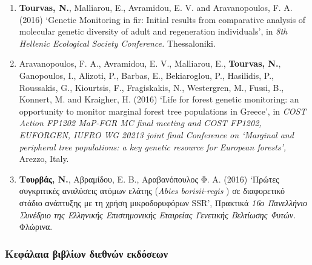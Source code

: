\documentclass[12pt,]{scrartcl}
\begin{document}
\begin{enumerate}
\leftskip-0.07in  
\item {\textbf{Tourvas, N.}, Malliarou, E., Avramidou, E. V. and Aravanopoulos, F. A. (2016) ‘Genetic Monitoring in fir: Initial results from comparative analysis of molecular genetic diversity of adult and regeneration individuals’, in \textit{8th Hellenic Ecological Society Conference.} Thessaloniki.}

\leftskip-0.07in  
\item {Aravanopoulos, F. A., Avramidou, E. V., Malliarou, E., \textbf{Tourvas, N.}, Ganopoulos, I., Alizoti, P., Barbas, E., Bekiaroglou, P., Hasilidis, P., Roussakis, G., Kiourtsis, F., Fragiskakis, N., Westergren, M., Fussi, B., Konnert, M. and Kraigher, H. (2016) ‘Life for forest genetic monitoring: an opportunity to monitor marginal forest tree populations in Greece’, in \textit{COST Action FP1202 MaP-FGR MC final meeting and COST FP1202, EUFORGEN, IUFRO WG 20213 joint final Conference on ‘Marginal and peripheral tree populations: a key genetic resource for European forests’,} Arezzo, Italy.}

\leftskip-0.07in  
\item {\textbf{Τουρβάς, Ν.}, Αβραμίδου, Ε. Β., Αραβανόπουλος Φ. Α. (2016) ‘Πρώτες συγκριτικές αναλύσεις ατόμων ελάτης (\textit{Abies borisii-regis}
) σε διαφορετικό στάδιο ανάπτυξης με τη χρήση μικροδορυφόρων SSR’, Πρακτικά \textit{16ο Πανελλήνιο Συνέδριο της Ελληνικής Επιστημονικής Εταιρείας Γενετικής Βελτίωσης Φυτών.} Φλώρινα.}

\end{enumerate}


\subsubsection{Κεφάλαια βιβλίων διεθνών εκδόσεων}\label{book-chapters}
\end{document}
